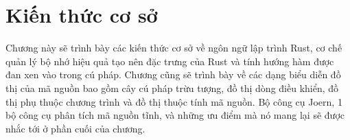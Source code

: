 \chapter{Kiến thức cơ sở}
\label{chap:background}

Chương này sẽ trình bày các kiến thức cơ sở về ngôn ngữ lập trình Rust, cơ chế quản lý bộ nhớ hiệu quả tạo nên đặc trưng của Rust và tính hướng hàm được đan xen vào trong cú pháp.
Chương cũng sẽ trình bày về các dạng biểu diễn đồ thị của mã nguồn bao gồm cây cú pháp trừu tượng, đồ thị dòng điều khiển, đồ thị phụ thuộc chương trình và đồ thị thuộc tính mã nguồn.
Bộ công cụ Joern, 1 bộ công cụ phân tích mã nguồn tĩnh, và những ưu điểm mà nó mang lại sẽ được nhắc tới ở phần cuối của chương.




